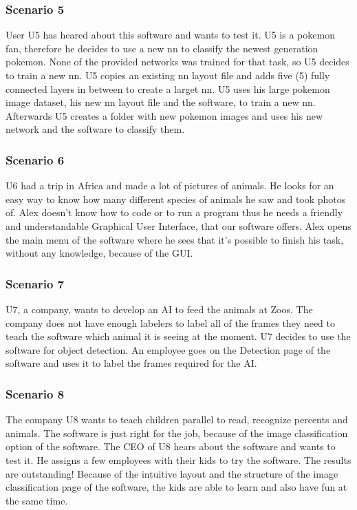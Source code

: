 \documentclass[parskip=full]{scrartcl}
\begin{document}
\subsubsection{Scenario 5}
User U5 has heared about this software and wants to test it.
U5 is a pokemon fan, therefore he decides to use a new \gls{nn} to classify the newest generation pokemon. None of the provided networks was trained for that task, so U5 decides to train a new \gls{nn}. U5 copies an existing \gls{nn} layout file and adds five (5) fully connected layers in between to create a larget \gls{nn}. U5 uses his large pokemon image dataset, his new \gls{nn} layout file and the software, to train a new \gls{nn}. 
Afterwards U5 creates a folder with new pokemon images and uses his new network and the software to classify them.
\subsubsection{Scenario 6}
U6 had a trip in Africa and made a lot of pictures of animals. He looks for an easy way to know how many different species of animals he saw and took photos of. Alex doesn't know how to code or to run a program thus he needs a friendly and understandable Graphical User Interface, that our software offers. Alex opens the main menu of the software where he sees that it's possible to finish his task, without any knowledge, because of the GUI. 
\clearpage
\subsubsection{Scenario 7}
U7, a company, wants to develop an AI to feed the animals at Zoos. The company does not have enough labelers to label all of the frames they need to teach the software which animal it is seeing at the moment. U7 decides to use the software for object detection. An employee goes on the Detection page of the software and uses it to label the frames required for the AI.
\subsubsection{Scenario 8}
The company U8 wants to teach children parallel to read, recognize percents and animals. The software is just right for the job, because of the \gls{image classification} option of the software. The CEO of U8 hears about the software and wants to test it. He assigns a few employees with their kids to try the software. The results are outstanding! Because of the intuitive layout and the structure of the \gls{image classification} page of the software, the kids are able to learn and also have fun at the same time.
\clearpage
\end{document}
